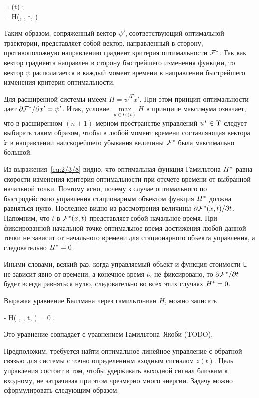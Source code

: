 \beqarr
    	 = \psi(t) \mbox{;} \\
    	 = \funcH \eqdef H(\optX, \optU, t, \psi)
\eeqarr

Таким образом, сопряженный вектор $\psi'$, соответствующий оптимальной траектории, представляет собой вектор, направленный в сторону, противоположную направлению градиент критерия оптимальности $\mathcal{F}^{*}$. Так как вектор градиента направлен в сторону быстрейшего изменения функции, то вектор $\psi$ располагается в каждый момент времени в направлении быстрейшего изменения критерия оптимальности.

Для расширенной системы имеем $H = \psi'^T\dot{x}'$. При этом принцип оптимальности дает $\partial {    \mathcal{F}  ^{*}  } / \partial {x'} = \psi'$. Итак, условие $\max\limits_{u \in \Omega(t)} H$ в принципе максимума означает, что в расширенном $(n+1)$-мерном пространстве управлений $u^{*} \in \Upsilon$ следует выбирать таким образом, чтобы в любой момент времени составляющая вектора $\dot{x}$ в направлении наискорейшего убывания величины $\mathcal{F}^{*}$ была максимально большой.

Из выражения~\ref{eq:2/3/8} видно, что оптимальная функция Гамильтона $H^{*}$ равна скорости изменения критерия оптимальности при отсчете времени от выбранной начальной точки. Поэтому ясно, почему в случае оптимального по быстродействию управления стационарным объектом функция $H^{*}$ должна равняться нулю. Последнее видно из рассмотрения величины $\partial {    \mathcal{F}  ^{*}  (x, t)} / \partial {t}$. Напомним, что $t$ в $\mathcal{F}^{*}(x, t)$ представляет собой начальное время. При фиксированной начальной точке оптимальное время достижения любой данной точки не зависит от начального времени для стационарного объекта управления, а следовательно $H^{*} = 0$.

Иными словами, всякий раз, когда управляемый объект и функция стоимости $\mathsf{L}$ не зависит явно от времени, а конечное время $t_2$ не фиксировано, то $\partial {    \mathcal{F}  ^{*}  } / \partial {t}$ будет всегда равняться нулю, следовательно во всех этих случаях $H^{*} = 0$.

Выражая уравнение Беллмана через гамильтониан $H$, можно записать

     - H\biggl( \optX, \optU, t,  \biggr) = 0 \mbox{.}
\eeq

Это уравнение совпадает с уравнением Гамильтона--Якоби (TODO).

\br

Предположим, требуется найти оптимальное линейное управление с обратной связью для системы с точно определенным входным сигналом $z(t)$. Цель управления состоит в том, чтобы удерживать выходной сигнал близким к входному, не затрачивая при этом чрезмерно много энергии. Задачу можно сформулировать следующим образом.

